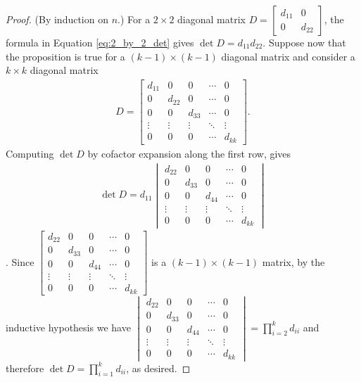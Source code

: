 \documentclass[12pt,letterpaper,reqno]{article}
\numberwithin{equation}{section}
\begin{document}
\begin{proof}
	(By induction on $n$.) For a $2 \times 2$ diagonal matrix $D=\begin{bmatrix}
		d_{11} & 0 \\
		0 & d_{22}
	\end{bmatrix}$, the formula in Equation \eqref{eq:2_by_2_det} gives $\det D=d_{11}d_{22}$. Suppose now that the proposition is true for a $(k-1) \times (k-1)$ diagonal matrix and consider a $k \times k$ diagonal matrix
	\begin{align*}
		D=\begin{bmatrix}
			d_{11} & 0 & 0 & \cdots & 0 \\
			0 & d_{22} & 0 & \cdots & 0 \\
			0 & 0 & d_{33} & \cdots & 0 \\
			\vdots & \vdots & \vdots & \ddots & \vdots \\
			0 & 0 & 0 & \cdots & d_{kk}
		\end{bmatrix}.
	\end{align*}
	Computing $\det D$ by cofactor expansion along the first row, gives 
	\begin{align*}
		\det D=d_{11}\begin{vmatrix}
			d_{22} & 0 & 0 & \cdots & 0 \\
			0 & d_{33} & 0 & \cdots & 0 \\
			0 & 0 & d_{44} & \cdots & 0 \\
			\vdots & \vdots & \vdots & \ddots & \vdots \\
			0 & 0 & 0 & \cdots & d_{kk}
		\end{vmatrix}
	\end{align*}.
	Since $\begin{bmatrix}
			d_{22} & 0 & 0 & \cdots & 0 \\
			0 & d_{33} & 0 & \cdots & 0 \\
			0 & 0 & d_{44} & \cdots & 0 \\
			\vdots & \vdots & \vdots & \ddots & \vdots \\
			0 & 0 & 0 & \cdots & d_{kk}
		\end{bmatrix}$ is a $(k-1) \times (k-1)$ matrix, by the inductive hypothesis we have  $\begin{vmatrix}
			d_{22} & 0 & 0 & \cdots & 0 \\
			0 & d_{33} & 0 & \cdots & 0 \\
			0 & 0 & d_{44} & \cdots & 0 \\
			\vdots & \vdots & \vdots & \ddots & \vdots \\
			0 & 0 & 0 & \cdots & d_{kk}
		\end{vmatrix}=\prod_{i=2}^kd_{ii}$ and therefore $\det D=\prod_{i=1}^kd_{ii}$, as desired.
\end{proof}
\end{document}
